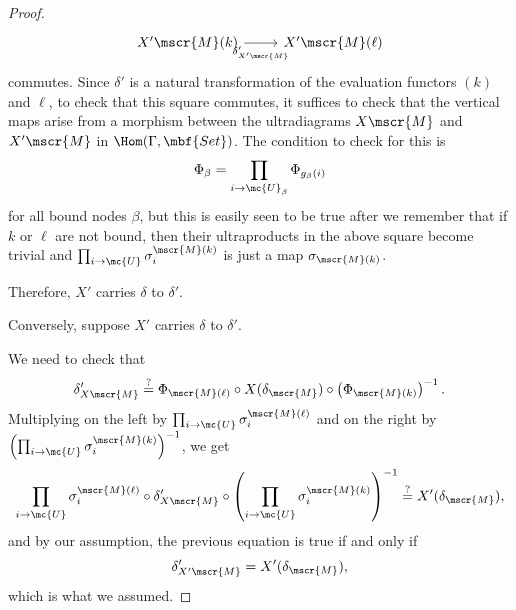 \begin{proof}
$$\begin{tikzcd}[ampersand replacement = \&]
X' \mscr{M}(k) \arrow[swap]{r}{\delta'_{X' \mscr{M}}}  \& X' \mscr{M}(\ell)
  \end{tikzcd}
  $$
  commutes. Since $\delta'$ is a natural transformation of the evaluation functors $(k)$ and $\ell$, to check that this square commutes, it suffices to check that the vertical maps arise from a morphism between the ultradiagrams $X \mscr{M}$ and $X' \mscr{M}$ in $\Hom(\Gamma, \mbf{Set})$. The condition to check for this is
  $$
\Phi_{\beta} = \prod_{i \to \mc{U}_{\beta}} \Phi_{g_{\beta}(i)}
$$
for all bound nodes $\beta$, but this is easily seen to be true after we remember that if $k$ or $\ell$ are not bound, then their ultraproducts in the above square become trivial and $\prod_{i \to \mc{U}} \sigma_i^{\mscr{M}(k)}$ is just a map $\sigma_{\mscr{M}(k)}$.

Therefore, $X'$ carries $\delta$ to $\delta'$.

Conversely, suppose $X'$ carries $\delta$ to $\delta'$.

We need to check that $$\delta'_{X \mscr{M}} \overset{?}{=} \Phi_{\mscr{M}(\ell)} \circ X(\delta_{\mscr{M}}) \circ \left(\Phi_{\mscr{M}(k)}\right)^{-1}.$$ Multiplying on the left by $\prod_{i \to \mc{U}} \sigma^{\mscr{M}(\ell)}_i$ and on the right by $\left(\prod_{i \to \mc{U}} \sigma^{\mscr{M}(k)}_i \right)^{-1}$, we get
$$
\prod_{i \to \mc{U}} \sigma^{\mscr{M}(\ell)}_i \circ \delta'_{X \mscr{M}} \circ \left(\prod_{i \to \mc{U}} \sigma^{\mscr{M}(k)}_i \right)^{-1} \overset{?}{=} X'(\delta_{\mscr{M}}),
$$
and by our assumption, the previous equation is true if and only if
$$
\delta'_{X' \mscr{M}} = X'(\delta_{\mscr{M}}),
$$
which is what we assumed.
\end{proof}
